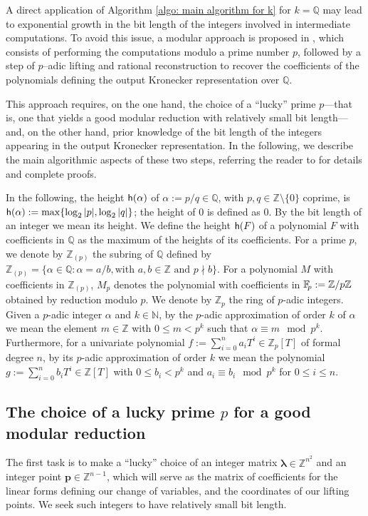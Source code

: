 \documentclass[pdflatex,sn-basic]{sn-jnl}%
\theoremstyle{thmstyleone}%
\theoremstyle{thmstyletwo}%
\theoremstyle{thmstylethree}%
\theoremstyle{definition}
\numberwithin{equation}{section}
\newcommand{\bfs}{\boldsymbol}
\newcommand{\Z}{\mathbb Z}
\newcommand{\F}{\mathbb F}
\newcommand{\Q}{\mathbb Q}
\newcommand{\fp}{\F_{\hskip-0.7mm p}}
\begin{document}
A direct application of Algorithm \ref{algo: main algorithm for k}
for $k=\Q$ may lead to exponential growth in the bit length of the
integers involved in intermediate computations. To avoid this issue,
a modular approach is proposed in \cite{GiMa19}, which consists of
performing the computations modulo a prime number $p$, followed by a
step of $p$--adic lifting and rational reconstruction to recover the
coefficients of the polynomials defining the output Kronecker
representation over $\Q$.

This approach requires, on the one hand, the choice of a ``lucky''
prime $p$---that is, one that yields a good modular reduction
with relatively small bit length---and, on the other hand, prior
knowledge of the bit length of the integers appearing in the output
Kronecker representation. In the following, we describe the main
algorithmic aspects of these two steps, referring the reader to
\cite{GiMa19} for details and complete proofs.

In the following, the height ${\sf h}(\alpha)$ of $\alpha:=p/q\in\Q$,
with $p,q\in\Z\setminus\{0\}$ coprime, is ${\sf
h}(\alpha):=\max\{\log_2 |p|, \log_2 |q|\}$; the height of $0$ is
defined as $0$. By the bit length of an integer we mean its height.
We define the height ${\sf h}(F)$ of a polynomial $F$ with
coefficients in $\Q$ as the  maximum of the heights of its
coefficients. For a prime $p$, we denote by $\Z_{(p)}$ the subring
of $\Q$ defined by $\Z_{(p)}=\{\alpha \in \Q: \alpha = a/b, \text{
with } a, b \in \Z \text{ and } p \nmid b \}$. For a polynomial $M$
with coefficients in $\Z_{(p)}$, $M_p$ denotes the polynomial with
coefficients in $\fp:=\Z/p\Z$ obtained by reduction modulo $p$. We
denote by $\Z_p$ the ring of $p$-adic integers. Given a $p$-adic
integer $\alpha$ and $k\in \mathbb{N}$, by the $p$-adic
approximation of order $k$ of $\alpha$ we mean the element $m\in \Z$
with $0 \le m < p^k$ such that $\alpha \equiv m \mod p^k$. Furthermore,
for a univariate polynomial  $f:=\sum_{i=0}^ na_iT^i\in \Z_p[T]$ of
formal degree $n$, by its $p$-adic approximation of order $k$ we
mean the polynomial $g:=\sum_{i=0}^ nb_iT^i \in \Z[T]$ with $0\le b_i
< p^k$ and $a_i\equiv b_i \mod p^k$ for $0 \le i \le n$.
%
%
\subsection{The choice of a lucky prime $p$ for a good modular reduction}
%
The first task is to make a ``lucky'' choice of an integer matrix
$\bfs\lambda\in \Z^{n^2}$ and an integer point $\bfs p\in \Z^{n-1}$,
which will serve as the
matrix of coefficients for the linear forms defining our change of
variables, and the coordinates of our lifting points. We seek such
integers to have relatively small bit length.
\end{document}
